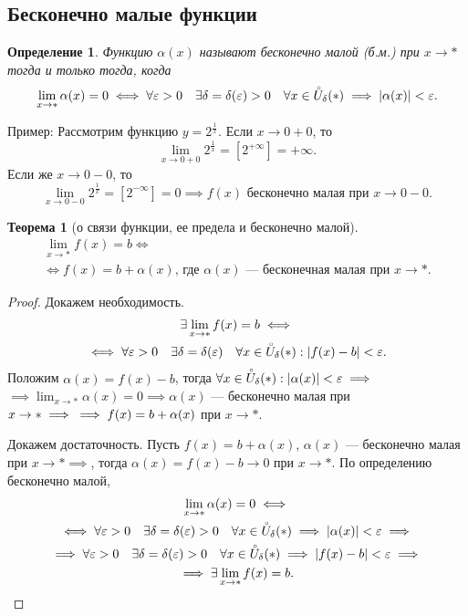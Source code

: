 \documentclass[a4paper,12pt]{article} %
\newtheorem{definition}{Определение}[section]
\newtheorem{theorem}{Теорема}[section]
\theoremstyle{remark}
\theoremstyle{definition}
\begin{document}
\subsection{Бесконечно малые функции}
  \begin{definition}
  	Функцию $\alpha(x)$ называют бесконечно малой (б.м.) при $x \to  *$ тогда и только тогда, когда 
  	\[
  	  \lim_{x \to *} \alpha(x) = 0 \iff \forall  \varepsilon>0 \quad \exists \delta=\delta(\varepsilon) > 0 \quad \forall x \in  \accentset{\circ}{U}_\delta(*) \implies |\alpha(x)| < \varepsilon
  	.\] 
  \end{definition}
  \noindent Пример: Рассмотрим функцию $y = 2^{\frac{1}{x}}$. Если $x\to 0+0$, то
  \[
    \lim_{x \to 0+0} 2^{\frac{1}{x}} = [2^{+\infty}] = +\infty
  .\]
  Если же $x\to 0-0$, то
  \[
    \lim_{x \to 0-0} 2^{\frac{1}{x}} = [2^{-\infty}] = 0 \implies f(x) \text{ бесконечно малая при } x \to 0-0
  .\]
  
  \begin{theorem}[о связи функции, ее предела и бесконечно малой]
  \begin{multline}
  \lim_{x \to *} f(x) = b \iff \\
  \iff f(x) = b + \alpha(x) \text{, где }\alpha(x) \text{ --- бесконечная малая при }x\to *.
  \end{multline}
  \end{theorem}
  \begin{proof}
    Докажем необходимость.
    \begin{multline}
      \exists \lim_{x \to *} f(x) = b \iff \\
      \iff \forall \varepsilon>0 \quad \exists \delta=\delta(\varepsilon) \quad \forall x\in \accentset{\circ}{U}_\delta(*) : |f(x) - b| < \varepsilon.
    \end{multline}
    Положим $\alpha(x)=f(x)-b$, тогда $\forall x\in \accentset{\circ}{U}_\delta(*) : |\alpha(x)|<\varepsilon \implies$ \\
    $\implies \lim_{x \to *} \alpha(x) = 0 \implies \alpha(x)$ --- бесконечно малая при $x\to * \implies \\
    \implies f(x) = b + \alpha(x)$ при $x\to *$.
    
    Докажем достаточность. Пусть $f(x) = b + \alpha(x)$,  $\alpha(x)$ --- бесконечно малая при  $x \to  * \implies$, тогда $\alpha(x) = f(x) - b \to  0 \text{ при } x\to *$. По определению бесконечно малой,
    \begin{multline}
      \lim_{x \to *} \alpha(x) = 0 \iff \\
      \iff \forall  \varepsilon>0 \quad \exists \delta=\delta(\varepsilon) > 0 \quad \forall x \in \accentset{\circ}{U}_\delta(*) \implies |\alpha(x)| < \varepsilon \implies \\
      \implies \forall  \varepsilon>0 \quad \exists \delta=\delta(\varepsilon) > 0 \quad \forall x \in \accentset{\circ}{U}_\delta(*) \implies |f(x)-b| < \varepsilon \implies \\
      \implies \exists \lim_{x \to *} f(x) = b.
    \end{multline}
  \end{proof}
\end{document}
